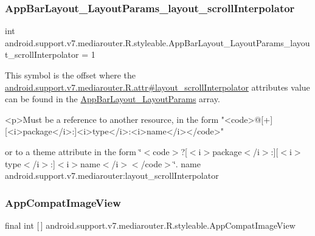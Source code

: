 \subsubsection{\texorpdfstring{App\+Bar\+Layout\+\_\+\+Layout\+Params\+\_\+layout\+\_\+scroll\+Interpolator}{AppBarLayout\_LayoutParams\_layout\_scrollInterpolator}}
{\footnotesize\ttfamily int android.\+support.\+v7.\+mediarouter.\+R.\+styleable.\+App\+Bar\+Layout\+\_\+\+Layout\+Params\+\_\+layout\+\_\+scroll\+Interpolator = 1\hspace{0.3cm}{\ttfamily [static]}}

This symbol is the offset where the \hyperlink{classandroid_1_1support_1_1v7_1_1mediarouter_1_1R_1_1attr_afb1d27cde9e0adc7649345bdf80cdb15}{android.\+support.\+v7.\+mediarouter.\+R.\+attr\#layout\+\_\+scroll\+Interpolator} attribute\textquotesingle{}s value can be found in the \hyperlink{classandroid_1_1support_1_1v7_1_1mediarouter_1_1R_1_1styleable_ad56052828eb14d75ca60a6e450bcbcd5}{App\+Bar\+Layout\+\_\+\+Layout\+Params} array.

\begin{DoxyVerb}      <p>Must be a reference to another resource, in the form "<code>@[+][<i>package</i>:]<i>type</i>:<i>name</i></code>"
\end{DoxyVerb}
 or to a theme attribute in the form \char`\"{}$<$code$>$?\mbox{[}$<$i$>$package$<$/i$>$\+:\mbox{]}\mbox{[}$<$i$>$type$<$/i$>$\+:\mbox{]}$<$i$>$name$<$/i$>$$<$/code$>$\char`\"{}.  name android.\+support.\+v7.\+mediarouter\+:layout\+\_\+scroll\+Interpolator \mbox{\label{classandroid_1_1support_1_1v7_1_1mediarouter_1_1R_1_1styleable_a0ce9cb60cf11193ca8edd3c65353bedf}} 
\subsubsection{\texorpdfstring{App\+Compat\+Image\+View}{AppCompatImageView}}
{\footnotesize\ttfamily final int \mbox{[}$\,$\mbox{]} android.\+support.\+v7.\+mediarouter.\+R.\+styleable.\+App\+Compat\+Image\+View\hspace{0.3cm}{\ttfamily [static]}}

